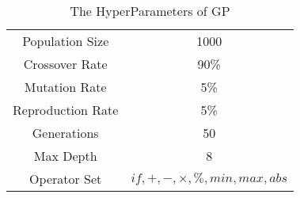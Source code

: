 \begin{table}[H]
    \caption{The HyperParameters of GP}
    \begin{tabular}{|c|c|}
        \hline 
        Population Size & 1000 \\
        Crossover Rate & 90\% \\
        Mutation Rate & 5\% \\
        Reproduction Rate & 5\% \\
        Generations & 50 \\
        Max Depth & 8 \\
        Operator Set & $if,+,-,\times,\%,min,max,abs$ \\
        \hline 
    \end{tabular}
    \label{tab:hyper_param}
\end{table}